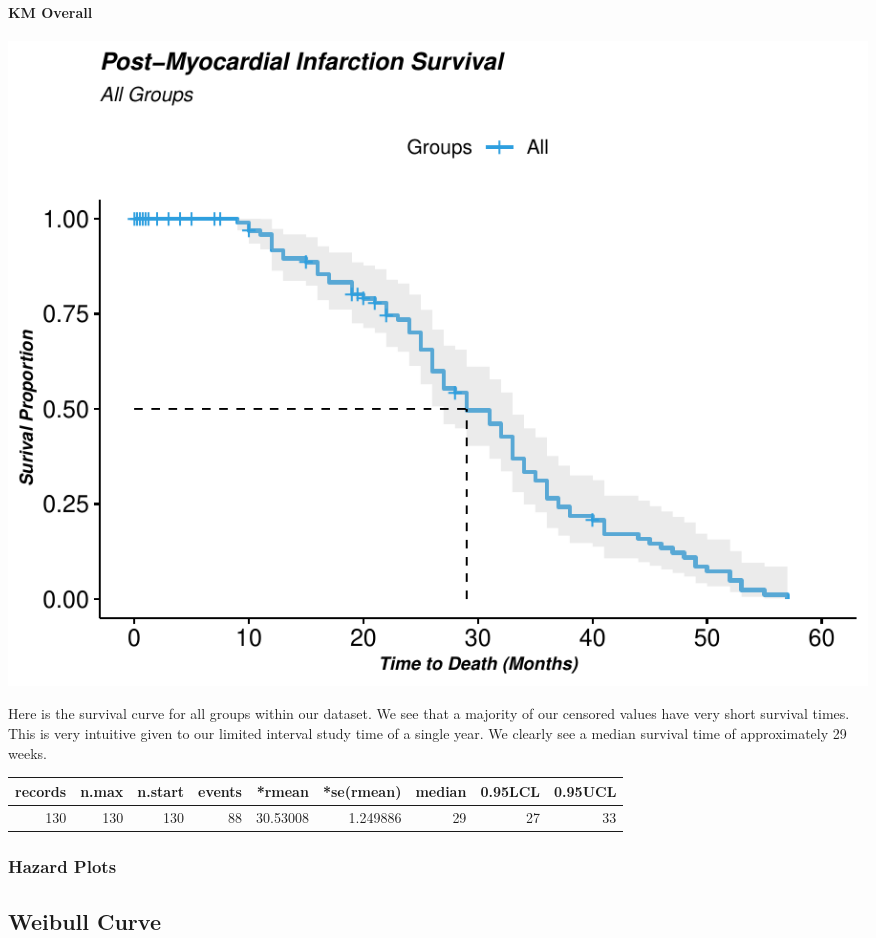 \documentclass[
]{article}
\begin{document}
\hypertarget{km-overall}{%
\paragraph{KM Overall}\label{km-overall}}

\begin{center}\includegraphics{markdown_files/figure-latex/km.all-1} \end{center}

Here is the survival curve for all groups within our dataset. We see
that a majority of our censored values have very short survival times.
This is very intuitive given to our limited interval study time of a
single year. We clearly see a median survival time of approximately 29
weeks.

\begin{tabular}{r|r|r|r|r|r|r|r|r}
\hline
records & n.max & n.start & events & *rmean & *se(rmean) & median & 0.95LCL & 0.95UCL\\
\hline
130 & 130 & 130 & 88 & 30.53008 & 1.249886 & 29 & 27 & 33\\
\hline
\end{tabular}

\hypertarget{hazard-plots}{%
\subsubsection{Hazard Plots}\label{hazard-plots}}

\hypertarget{weibull-curve}{%
\subsection{Weibull Curve}\label{weibull-curve}}
\end{document}
